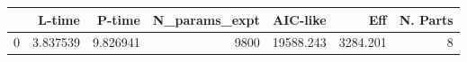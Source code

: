 \begin{tabular}{lrrrrrr}
\toprule
{} &    L-time &    P-time &  N\_params\_expt &   AIC-like &       Eff &  N. Parts \\
\midrule
0 &  3.837539 &  9.826941 &           9800 &  19588.243 &  3284.201 &         8 \\
\bottomrule
\end{tabular}
